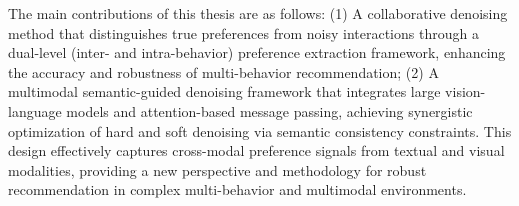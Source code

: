 \begin{eabstract}
The main contributions of this thesis are as follows:
(1) A collaborative denoising method that distinguishes true preferences from noisy interactions through a dual-level (inter- and intra-behavior) preference extraction framework, enhancing the accuracy and robustness of multi-behavior recommendation;
(2) A multimodal semantic-guided denoising framework that integrates large vision-language models and attention-based message passing, achieving synergistic optimization of hard and soft denoising via semantic consistency constraints. This design effectively captures cross-modal preference signals from textual and visual modalities, providing a new perspective and methodology for robust recommendation in complex multi-behavior and multimodal environments.


\end{eabstract}
